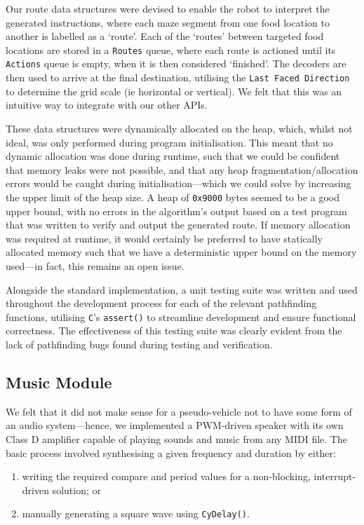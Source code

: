 \documentclass[conference]{IEEEtran}
\begin{document}
Our route data structures were devised to enable the robot to interpret the generated instructions, where each maze segment from one food location to another is labelled as a `route'.
Each of the `routes' between targeted food locations are stored in a \texttt{Routes} queue, where each route is actioned until its \texttt{Actions} queue is empty, when it is then considered `finished'.
The decoders are then used to arrive at the final destination, utilising the \texttt{Last Faced Direction} to determine the grid scale (ie horizontal or vertical).
We felt that this was an intuitive way to integrate with our other APIs.

These data structures were dynamically allocated on the heap, which, whilst not ideal, was only performed during program initialisation.
This meant that no dynamic allocation was done during runtime, such that we could be confident that memory leaks were not possible, and that any heap fragmentation/allocation errors would be caught during initialisation—which we could solve by increasing the upper limit of the heap size.
A heap of \texttt{0x9000} bytes seemed to be a good upper bound, with no errors in the algorithm's output based on a test program that was written to verify and output the generated route.
If memory allocation was required at runtime, it would certainly be preferred to have statically allocated memory such that we have a deterministic upper bound on the memory used—in fact, this remains an open issue.

Alongside the standard implementation, a unit testing suite was written and used throughout the development process for each of the relevant pathfinding functions, utilising \texttt{C}'s \texttt{assert()} to streamline development and ensure functional correctness.
The effectiveness of this testing suite was clearly evident from the lack of pathfinding bugs found during testing and verification.

\subsection{Music Module}

We felt that it did not make sense for a pseudo-vehicle not to have some form of an audio system—hence, we implemented a PWM-driven speaker with its own Class D amplifier capable of playing sounds and music from any MIDI file.
The basic process involved synthesising a given frequency and duration by either:
\begin{enumerate}
	\item writing the required compare and period values for a non-blocking, interrupt-driven solution; or
	\item manually generating a square wave using \texttt{CyDelay()}.
\end{enumerate}
\end{document}
